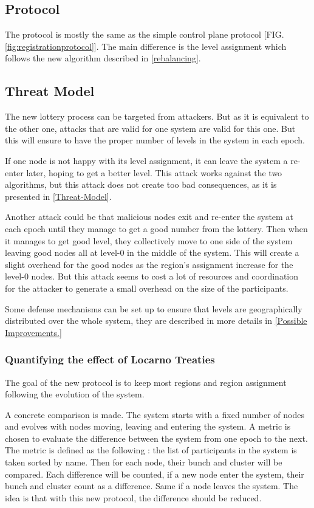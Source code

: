 \documentclass[a4paper,11pt,oneside]{report}
\begin{document}
\subsection{Protocol}
The protocol is mostly the same as the simple control plane protocol [FIG.
\autoref{fig:registrationprotocol}]. The main difference is the level assignment
which follows the new algorithm described in \autoref{rebalancing}. 

\subsection{Threat Model}

The new lottery process can be targeted from attackers. But as it is equivalent
to the other one, attacks that are valid for one system are valid for this one.
But this will ensure to have the proper number of levels in the system in each
epoch.

If one node is not happy with its level assignment, it can leave the system a
re-enter later, hoping to get a better level. This attack works against the two
algorithms, but this attack does not create too
bad consequences, as it is presented in \autoref{Threat-Model}.

Another attack could be that malicious nodes exit and re-enter the system at
each epoch until they manage to get a good number from the lottery. Then when
it manages to get good level, they collectively move to one side of the system
leaving good nodes all at level-0 in the middle of the system. This will create
a slight overhead for the good nodes as the region’s assignment increase for
the level-0 nodes. But this attack seems to cost a lot of resources and
coordination for the attacker to generate a small overhead on the size of the
participants.

Some defense mechanisms can be set up to ensure that levels are geographically
distributed over the whole system, they are described in more details in
\autoref{Possible Improvements.} 

\subsubsection{Quantifying the effect of Locarno Treaties}
The goal of the new protocol is to keep most regions and region assignment
following the evolution of the system. 

A concrete comparison is made. The system starts with a fixed number of nodes
and evolves with nodes moving, leaving and entering the system. A metric is
chosen to evaluate the difference between the system from one epoch to the
next. The metric is defined as the following :  the list of participants in the
system is taken sorted by name. Then for each node, their bunch and cluster
will be compared. Each difference will be counted, if a new node enter the
system, their bunch and cluster count as a difference. Same if a node leaves
the system. The idea is that with this new protocol, the difference should be
reduced. 
\end{document}
